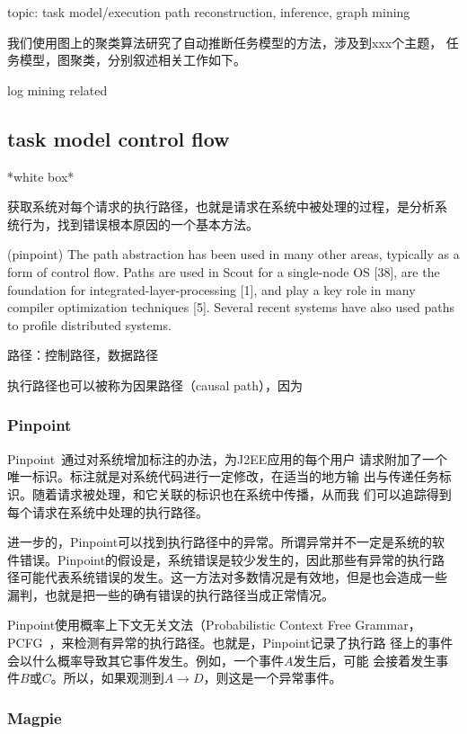 topic: task model/execution path reconstruction, inference, graph
mining

我们使用图上的聚类算法研究了自动推断任务模型的方法，涉及到xxx个主题，
任务模型，图聚类，分别叙述相关工作如下。

log mining related

\subsection{task model control flow}

*white box*

获取系统对每个请求的执行路径，也就是请求在系统中被处理的过程，是分析系
统行为，找到错误根本原因的一个基本方法。

(pinpoint) The path abstraction has been used in many other areas,
typically as a form of control flow. Paths are used in Scout for a
single-node OS [38], are the foundation for
integrated-layer-processing [1], and play a key role in many compiler
optimization techniques [5]. Several recent systems have also used
paths to profile distributed systems.

路径：控制路径，数据路径


执行路径也可以被称为因果路径（causal path），因为


\subsubsection*{Pinpoint}

Pinpoint~\cite{pinpoint}通过对系统增加标注的办法，为J2EE应用的每个用户
请求附加了一个唯一标识。标注就是对系统代码进行一定修改，在适当的地方输
出与传递任务标识。随着请求被处理，和它关联的标识也在系统中传播，从而我
们可以追踪得到每个请求在系统中处理的执行路径。

进一步的，Pinpoint可以找到执行路径中的异常。所谓异常并不一定是系统的软
件错误。Pinpoint的假设是，系统错误是较少发生的，因此那些有异常的执行路
径可能代表系统错误的发生。这一方法对多数情况是有效地，但是也会造成一些
漏判，也就是把一些的确有错误的执行路径当成正常情况。

Pinpoint使用概率上下文无关文法（Probabilistic Context Free Grammar，
PCFG~\cite{pcfg}，来检测有异常的执行路径。也就是，Pinpoint记录了执行路
径上的事件会以什么概率导致其它事件发生。例如，一个事件$A$发生后，可能
会接着发生事件$B$或$C$。所以，如果观测到$A \to D$，则这是一个异常事件。

\subsubsection*{Magpie}

